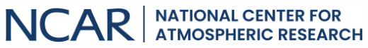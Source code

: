 \documentclass[final]{beamer}
\newlength{\onecolwid}
\begin{document}
\begin{frame}[t]
\begin{columns}[t]
\begin{column}{\onecolwid}
\begin{center}
\includegraphics[width=0.8\linewidth]{../logos/NCAR-contemp-logo-blue.png}
\end{center}


\end{column} %

\end{columns} %

\end{frame} %
\end{document}
